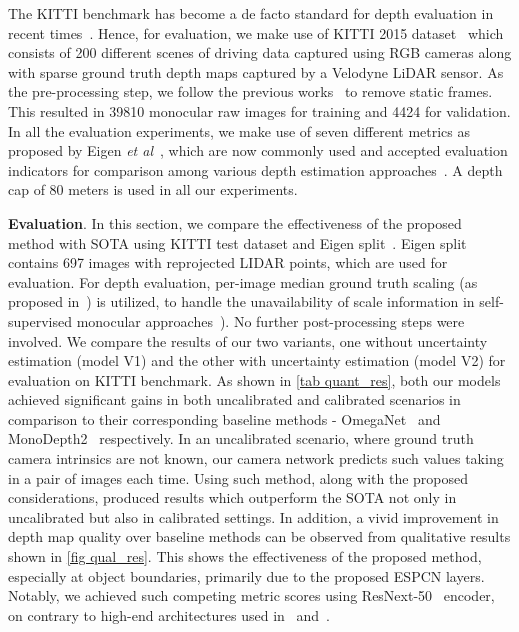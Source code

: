 \documentclass{bmvc2k}
\def\etal{\emph{et al}\bmvaOneDot}
\begin{document}
The KITTI benchmark has become a de facto standard for depth evaluation in recent times~\cite{guizilini20203d}. Hence, for evaluation, we make use of KITTI 2015 dataset~\cite{geiger2012we} which consists of 200 different scenes of driving data captured using RGB cameras along with sparse ground truth depth maps captured by a Velodyne LiDAR sensor. As the pre-processing step, we follow the previous works~\cite{zhou2017unsupervised} to remove static frames. This resulted in 39810 monocular raw images for training and 4424 for validation. In all the evaluation experiments, we make use of seven different metrics as proposed by Eigen \etal~\cite{eigen2014depth}, which are now commonly used and accepted evaluation indicators for comparison among various depth estimation approaches~\cite{zhao2020monocular}. A depth cap of 80 meters is used in all our experiments.



\textbf{Evaluation}. In this section, we compare the effectiveness of the proposed method with SOTA using KITTI test dataset and Eigen split~\cite{eigen2015predicting}. Eigen split contains 697 images with reprojected LIDAR points, which are used for evaluation. For depth evaluation, per-image median ground truth scaling (as proposed in~\cite{godard2019digging}) is utilized, to handle the unavailability of scale information in self-supervised monocular approaches~\cite{zhou2017unsupervised, godard2019digging}). No further post-processing steps were involved. We compare the results of our two variants, one without uncertainty estimation (model V1) and the other with uncertainty estimation (model V2) for evaluation on KITTI benchmark. As shown in \autoref{tab quant_res}, both our models achieved significant gains in both uncalibrated and calibrated scenarios in comparison to their corresponding baseline methods - OmegaNet~\cite{tosi2020distilled} and MonoDepth2~\cite{godard2019digging} respectively. In an uncalibrated scenario, where ground truth camera intrinsics are not known, our camera network predicts such values taking in a pair of images each time. Using such method, along with the proposed considerations, produced results which outperform the SOTA not only in uncalibrated but also in calibrated settings. In addition, a vivid improvement in depth map quality over baseline methods can be observed from qualitative results shown in \autoref{fig qual_res}. This shows the effectiveness of the proposed method, especially at object boundaries, primarily due to the proposed ESPCN layers. Notably, we achieved such competing metric scores using ResNext-50~\cite{xie2017aggregated} encoder, on contrary to high-end architectures used in~\cite{guizilini20203d} and~\cite{johnston2020self}.
\end{document}
